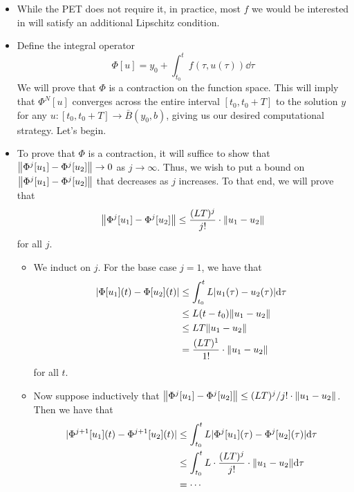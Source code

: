 \documentclass[../notes.tex]{subfiles}
\begin{document}
\begin{itemize}
    \begin{itemize}
        \item While the PET does not require it, in practice, most $f$ we would be interested in will satisfy an additional Lipschitz condition.
        \item Define the integral operator
        \begin{equation*}
            \Phi[u] = y_0+\int_{t_0}^tf(\tau,u(\tau))\dd\tau
        \end{equation*}
        We will prove that $\Phi$ is a contraction on the function space. This will imply that $\Phi^N[u]$ converges across the entire interval $[t_0,t_0+T]$ to the solution $y$ for any $u:[t_0,t_0+T]\to\bar{B}(y_0,b)$, giving us our desired computational strategy. Let's begin.
        \item To prove that $\Phi$ is a contraction, it will suffice to show that $\norm{\Phi^j[u_1]-\Phi^j[u_2]}\to 0$ as $j\to\infty$. Thus, we wish to put a bound on $\norm{\Phi^j[u_1]-\Phi^j[u_2]}$ that decreases as $j$ increases. To that end, we will prove that
        \begin{equation*}
            \norm{\Phi^j[u_1]-\Phi^j[u_2]} \leq \frac{(LT)^j}{j!}\cdot\norm{u_1-u_2}
        \end{equation*}
        for all $j$.
        \begin{itemize}
            \item We induct on $j$. For the base case $j=1$, we have that
            \begin{align*}
                |\Phi[u_1](t)-\Phi[u_2](t)| &\leq \int_{t_0}^tL|u_1(\tau)-u_2(\tau)|\dd\tau\\
                &\leq L(t-t_0)\norm{u_1-u_2}\\
                &\leq LT\norm{u_1-u_2}\\
                &= \frac{(LT)^1}{1!}\cdot\norm{u_1-u_2}
            \end{align*}
            for all $t$.
            \item Now suppose inductively that $\norm{\Phi^j[u_1]-\Phi^j[u_2]}\leq(LT)^j/j!\cdot\norm{u_1-u_2}$. Then we have that
            \begin{align*}
                |\Phi^{j+1}[u_1](t)-\Phi^{j+1}[u_2](t)| &\leq \int_{t_0}^tL|\Phi^j[u_1](\tau)-\Phi^j[u_2](\tau)|\dd\tau\\
                &\leq \int_{t_0}^tL\cdot\frac{(LT)^j}{j!}\cdot\norm{u_1-u_2}\dd\tau\\
                &= \cdots\\

\end{align*}
\end{itemize}
\end{itemize}
\end{itemize}
\end{document}
